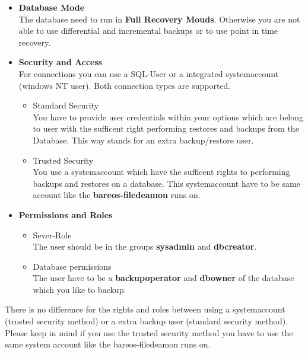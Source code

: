 \begin{itemize}

\item {\bf Database Mode}\\
The database need to run in {\bf Full Recovery Mouds}. Otherwise you are not able to use differential and incremental backups or to use point in time recovery.\\

\item {\bf Security and Access}\\
For connections you can use a SQL-User or a integrated systemaccount (windows NT user). Both connection types are supported.
	\begin{itemize}
        \item Standard Security \\
You have to provide user credentials within your options which are belong to user with the sufficent right performing restores and backups from the Database. This way stands for an extra backup/restore user.
	\item Trusted Security \\
	You use a systemaccount which have the sufficent rights to performing backups and restores on a database. This systemaccount have to be same account like the {\bf bareos-filedeamon} runs on.
	\end{itemize}
\item{\bf Permissions and Roles}
	\begin{itemize}
	\item Sever-Role\\
	The user should be in the groups {\bf sysadmin} and {\bf dbcreator}.
	\item Database permissions\\
	The user have to be a {\bf backupoperator} and {\bf dbowner} of the database which you like to backup.
	\end{itemize}
\end{itemize}
There is no difference for the rights and roles between using a systemaccount (trusted security method) or a extra backup user (standard security method).
Please keep in mind if you use the trusted security method you have to use the same system account like the bareos-filedeamon runs on.

